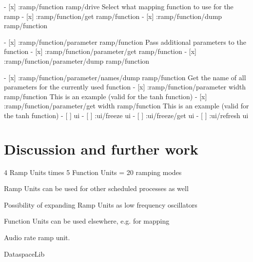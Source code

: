\documentclass{sig-alternate}
\begin{document}
		        - [x] :ramp/function                          ramp/drive     Select what mapping function to use for the ramp
		        - [x] :ramp/function/get                      ramp/function
		        - [x] :ramp/function/dump                     ramp/function	 
		
		        - [x] :ramp/function/parameter                ramp/function  Pass additional parameters to the function
		        - [x] :ramp/function/parameter/get            ramp/function
		        - [x] :ramp/function/parameter/dump           ramp/function	

		        - [x] :ramp/function/parameter/names/dump     ramp/function  Get the name of all parameters for the currently used function
		        - [x] :ramp/function/parameter width          ramp/function  This is an example (valid for the tanh function)
		        - [x] :ramp/function/parameter/get width      ramp/function  This is an example (valid for the tanh function)
		    - [ ] ui
		        - [ ] :ui/freeze                              ui
		        - [ ] :ui/freeze/get                          ui
				- [ ] :ui/refresh	                          ui







\section{Discussion and further work} %
\label{sec:discussion_and_further_work}


4 Ramp Units times 5 Function Units = 20 ramping modes

Ramp Units can be used for other scheduled processes as well

Possibility of expanding Ramp Units as low frequency oscillators

Function Units can be used elsewhere, e.g. for mapping

Audio rate ramp unit.

DataspaceLib





\end{document}
